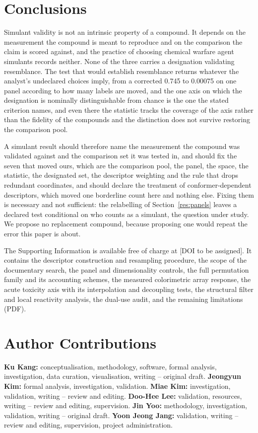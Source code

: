 \documentclass[journal=ancham,manuscript=article,margin=1in]{achemso}
\begin{document}
\section{Conclusions}
\label{sec:conclusions}

Simulant validity is not an intrinsic property of a compound. It depends on the
measurement the compound is meant to reproduce and on the comparison the claim
is scored against, and the practice of choosing chemical warfare agent simulants
records neither. None of the three carries a designation validating resemblance. The
test that would establish resemblance returns whatever the analyst's undeclared
choices imply, from a corrected 0.745 to 0.00075 on one panel according to how
many labels are moved, and the one axis on which the designation is
nominally distinguishable from chance is the one the stated criterion names,
and even there the statistic tracks the coverage of the axis rather than the
fidelity of the compounds and the distinction does not survive restoring the
comparison pool.

A simulant result should therefore name the measurement the compound was
validated against and the comparison set it was tested in, and should fix the
seven that moved ours, which are the comparison pool, the panel, the space,
the statistic, the designated set, the descriptor weighting and the rule that
drops redundant coordinates, and should declare the treatment of
conformer-dependent descriptors, which moved one borderline count here and
nothing else.
Fixing them is necessary and not sufficient: the relabelling of
Section~\ref{res:panels} leaves a declared test conditional on who counts as a
simulant, the question under study. We propose no replacement compound, because proposing
one would repeat the error this paper is about.

\begin{suppinfo}
The Supporting Information is available free of charge at [DOI to be assigned].
It contains the descriptor construction and resampling procedure, the scope of
the documentary search, the panel and dimensionality controls, the full
permutation family and its accounting schemes, the measured colorimetric array
response, the acute toxicity axis with its interpolation and decoupling tests,
the structural filter and local reactivity analysis, the dual-use audit, and the
remaining limitations (PDF).
\end{suppinfo}

\section*{Author Contributions}
\textbf{Ku Kang:} conceptualisation, methodology, software, formal analysis,
investigation, data curation, visualisation, writing -- original draft.
\textbf{Jeongyun Kim:} formal analysis, investigation, validation.
\textbf{Miae Kim:} investigation, validation, writing -- review and editing.
\textbf{Doo-Hee Lee:} validation, resources, writing -- review and
editing, supervision. \textbf{Jin Yoo:} methodology, investigation,
validation, writing -- original draft. \textbf{Yoon Jeong Jang:} validation,
writing -- review and editing, supervision, project administration.
\end{document}
